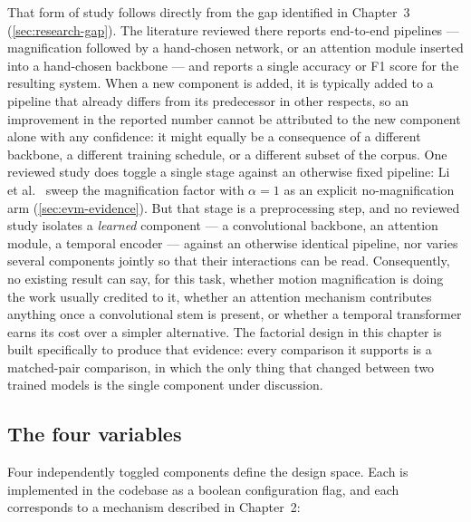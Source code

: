 That form of study follows directly from the gap identified in Chapter~3 (\autoref{sec:research-gap}). The literature reviewed there reports end-to-end pipelines --- magnification followed by a hand-chosen network, or an attention module inserted into a hand-chosen backbone --- and reports a single accuracy or F1 score for the resulting system. When a new component is added, it is typically added to a pipeline that already differs from its predecessor in other respects, so an improvement in the reported number cannot be attributed to the new component alone with any confidence: it might equally be a consequence of a different backbone, a different training schedule, or a different subset of the corpus. One reviewed study does toggle a single stage against an otherwise fixed pipeline: Li et al.~\cite{liX2018} sweep the magnification factor with $\alpha = 1$ as an explicit no-magnification arm (\autoref{sec:evm-evidence}). But that stage is a preprocessing step, and no reviewed study isolates a \textit{learned} component --- a convolutional backbone, an attention module, a temporal encoder --- against an otherwise identical pipeline, nor varies several components jointly so that their interactions can be read. Consequently, no existing result can say, for this task, whether motion magnification is doing the work usually credited to it, whether an attention mechanism contributes anything once a convolutional stem is present, or whether a temporal transformer earns its cost over a simpler alternative. The factorial design in this chapter is built specifically to produce that evidence: every comparison it supports is a matched-pair comparison, in which the only thing that changed between two trained models is the single component under discussion.

\subsection{The four variables}
\label{sec:four-variables}

Four independently toggled components define the design space. Each is implemented in the codebase as a boolean configuration flag, and each corresponds to a mechanism described in Chapter~2:

